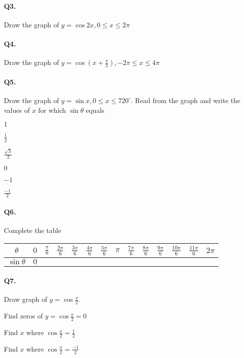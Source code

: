 \documentclass{article}
\begin{document}
\paragraph{Q3.}
Draw the graph of $y=\cos 2x, 0 \leq x \leq 2\pi$

\paragraph{Q4.}
Draw the graph of $y=\cos(x+\frac{\pi}{3}), -2\pi \leq x \leq 4\pi$

\paragraph{Q5.}
Draw the graph of $y=\sin x, 0 \leq x \leq 720^{\circ}$.
Read from the graph and write the values of $x$ for which $\sin\theta$ equals

\begin{enumerate*}[label=\alph*)]
  \item $1$
  \item $\frac{1}{2}$
  \item $\frac{\sqrt{3}}{2}$
  \item $0$
  \item $-1$
  \item $\frac{-1}{2}$
\end{enumerate*}

\paragraph{Q6.}
Complete the table

\begin{tabular}{|c|c|c|c|c|c|c|c|c|c|c|c|c|c|}
  \hline
$\theta$ & $0$ & $\frac{\pi}{6}$ & $\frac{2\pi}{6}$ & $\frac{3\pi}{6}$ & $\frac{4\pi}{6}$ & $\frac{5\pi}{6}$ & $\pi$ & $\frac{7\pi}{6}$ & $\frac{8\pi}{6}$ & $\frac{9\pi}{6}$ & $\frac{10\pi}{6}$ & $\frac{11\pi}{6}$ & $2\pi$ \\[3pt]
  \hline
$\sin\theta$ & $0$ & & & & & & & & & & & &\\
  \hline
\end{tabular}

\paragraph{Q7.}
Draw graph of $y = \cos \frac{x}{2}$.

\begin{enumerate*}[label=\alph*)]
  \item Find zeros of $y = \cos \frac{x}{2} = 0$
  \item Find $x$ where $\cos \frac{x}{2} = \frac{1}{2}$
  \item Find $x$ where $\cos \frac{x}{2} = \frac{-1}{2}$
\end{enumerate*}
\end{document}
